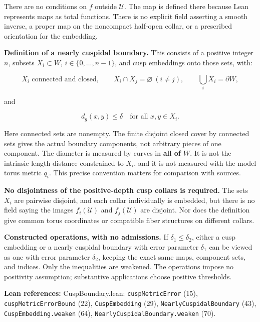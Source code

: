 \documentclass[
  letterpaper,
  11pt]{article}
\begin{document}
There are no conditions on \(f\) outside \(\mathcal U\). The map is
defined there because Lean represents maps as total functions. There is
no explicit field asserting a smooth inverse, a proper map on the
noncompact half-open collar, or a prescribed orientation for the
embedding.

\textbf{Definition of a nearly cuspidal boundary.} This consists of a
positive integer \(n\), subsets \(X_i\subset W\),
\(i\in\{0,\ldots,n-1\}\), and cusp embeddings onto those sets, with:

\[
 X_i\text{ connected and closed},\qquad X_i\cap X_j=\varnothing\ (i\ne j),\qquad
 \bigcup_iX_i=\partial W,
\]

and

\[
 d_g(x,y)\leq\delta\quad\text{for all }x,y\in X_i.
\]

Here connected sets are nonempty. The finite disjoint closed cover by
connected sets gives the actual boundary components, not arbitrary
pieces of one component. The diameter is measured by curves in
\textbf{all of \(W\)}. It is not the intrinsic length distance
constrained to \(X_i\), and it is not measured with the model torus
metric \(q_i\). This precise convention matters for comparison with
sources.

\textbf{No disjointness of the positive-depth cusp collars is required.}
The sets \(X_i\) are pairwise disjoint, and each collar individually is
embedded, but there is no field saying the images \(f_i(\mathcal U)\)
and \(f_j(\mathcal U)\) are disjoint. Nor does the definition give
common torus coordinates or compatible fiber structures on different
collars.

\textbf{Constructed operations, with no admissions.} If
\(\delta_1\leq\delta_2\), either a cusp embedding or a nearly cuspidal
boundary with error parameter \(\delta_1\) can be viewed as one with
error parameter \(\delta_2\), keeping the exact same maps, component
sets, and indices. Only the inequalities are weakened. The operations
impose no positivity assumption; substantive applications choose
positive thresholds.

\textbf{Lean references:} CuspBoundary.lean:
{\small\texttt{cusp\allowbreak{}Metric\allowbreak{}Error}} (15),
{\small\texttt{cusp\allowbreak{}Metric\allowbreak{}Error\allowbreak{}Bound}}
(22), {\small\texttt{Cusp\allowbreak{}Embedding}} (29),
{\small\texttt{Nearly\allowbreak{}Cuspidal\allowbreak{}Boundary}} (43),
{\small\texttt{Cusp\allowbreak{}Embedding.\allowbreak{}weaken}} (64),
{\small\texttt{Nearly\allowbreak{}Cuspidal\allowbreak{}Boundary.\allowbreak{}weaken}}
(70).
\end{document}
